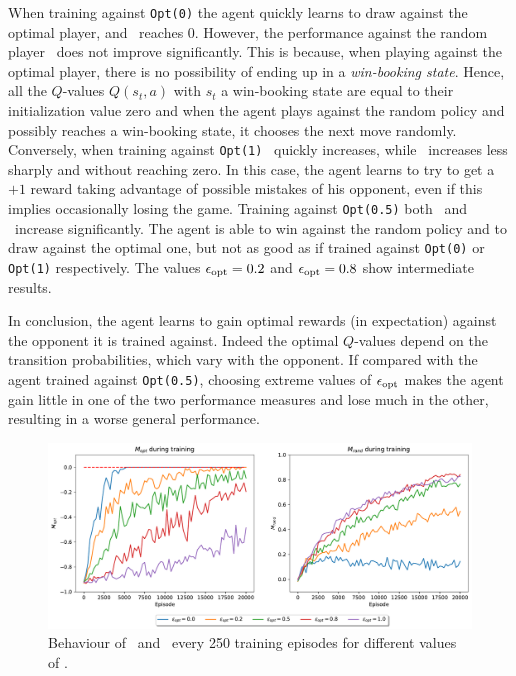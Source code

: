 \documentclass[10pt]{IEEEtran}
\begin{document}
When training against \texttt{Opt(0)} the agent quickly learns to draw against the optimal player, and \mopt\  reaches 0. However, the performance against the random player \mrand\  does not improve significantly. This is because, when playing against the optimal player, there is no possibility of ending up in a \emph{win-booking state}. Hence, all the $Q$-values $Q(s_t, a)$ with $s_t$ a win-booking state are equal to their initialization value zero and when the agent plays against the random policy and possibly reaches a win-booking state, it chooses the next move randomly. 
Conversely, when training against \texttt{Opt(1)} \mrand\  quickly increases, while \mopt\  increases less sharply and without reaching zero. In this case, the agent learns to try to get a $+1$ reward taking advantage of possible mistakes of his opponent, even if this implies occasionally losing the game. 
Training against \texttt{Opt(0.5)} both \mopt\  and \mrand\  increase significantly. The agent is able to win against the random policy and to draw against the optimal one, but not as good as if trained against \texttt{Opt(0)} or \texttt{Opt(1)} respectively. The values $\epsilon_{\text{opt}} = 0.2$ and $\epsilon_{\text{opt}} = 0.8$ show intermediate results. 

In conclusion, the agent learns to gain optimal rewards (in expectation) against the opponent it is trained against. Indeed the optimal $Q$-values depend on the transition probabilities, which vary with the opponent. If compared with the agent trained against \texttt{Opt(0.5)}, choosing extreme values of $\epsilon_{\text{opt}}$ makes the agent gain little in one of the two performance measures and lose much in the other, resulting in a worse general performance.

\begin{figure}[h]
    \centering
    \includegraphics[width=\linewidth]{code/figures/performance_epsilon_opt.pdf}
    \caption{Behaviour of \mopt\  and \mrand\  every 250 training episodes for different values of \eopt.}
    \label{plot_question4}
\end{figure}
\end{document}
